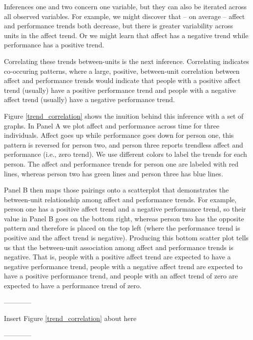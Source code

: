 \documentclass[english,,man]{apa6}
\theoremstyle{definition}
\theoremstyle{definition}
\theoremstyle{definition}
\theoremstyle{remark}
\begin{document}
Inferences one and two concern one variable, but they can also be
iterated across all observed variables. For example, we might discover
that -- on average -- affect and performance trends both decrease, but
there is greater variability across units in the affect trend. Or we
might learn that affect has a negative trend while performance has a
positive trend.

Correlating these trends between-units is the next inference.
Correlating indicates co-occuring patterns, where a large, positive,
between-unit correlation between affect and performance trends would
indicate that people with a positive affect trend (usually) have a
positive performance trend and people with a negative affect trend
(usually) have a negative performance trend.

Figure \ref{trend_correlation} shows the inuition behind this inference
with a set of graphs. In Panel A we plot affect and performance across
time for three individuals. Affect goes up while performance goes down
for person one, this pattern is reversed for person two, and person
three reports trendless affect and performance (i.e., zero trend). We
use different colors to label the trends for each person. The affect and
performance trends for person one are labeled with red lines, whereas
person two has green lines and person three has blue lines.

Panel B then maps those pairings onto a scatterplot that demonstrates
the between-unit relationship among affect and performance trends. For
example, person one has a positive affect trend and a negative
performance trend, so their value in Panel B goes on the bottom right,
whereas person two has the opposite pattern and therefore is placed on
the top left (where the performance trend is positive and the affect
trend is negative). Producing this bottom scatter plot tells us that the
between-unit association among affect and performance trends is
negative. That is, people with a positive affect trend are expected to
have a negative performance trend, people with a negative affect trend
are expected to have a positive performance trend, and people with an
affect trend of zero are expected to have a performance trend of zero.

\begin{center}

------------

Insert Figure \ref{trend_correlation} about here

------------

\end{center}
\end{document}
